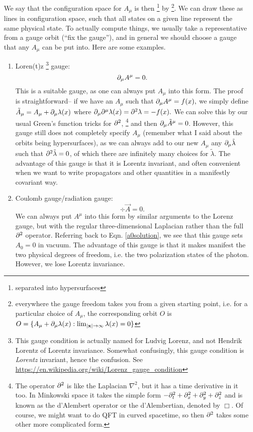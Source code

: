 We say that the configuration space for $A_\mu$ is then \footnote{separated into hypersurfaces} by \footnote{everywhere the gauge freedom takes you from a given starting point, i.e. for a particular choice of $A_\mu$, the corresponding orbit $O$ is $O=\{A_\mu+\partial_\mu \lambda(x): \lim_{|\boldsymbol{\mathbf{x}}|\to \infty }\lambda(x)=0\}$}. We can draw these as lines in configuration space, such that all states on a given line represent the same physical state. To actually compute things, we usually take a representative from a gauge orbit (``fix the gauge''), and in general we should choose a gauge that any $A_\mu$ can be put into. Here are some examples.
\begin{enumerate}
    \item Loren(t)z%
        \footnote{This gauge condition is actually named for Ludvig Lorenz, and not Hendrik Lorentz of Lorentz invariance. Somewhat confusingly, this gauge condition is \emph{Lorentz} invariant, hence the confusion. See \url{https://en.wikipedia.org/wiki/Lorenz_gauge_condition}}
        gauge:
    $$\partial_\mu A^\mu=0.$$
    This is a suitable gauge, as one can always put $A_\mu$ into this form. The proof is straightforward-- if we have an $A_\mu$ such that $\partial_\mu A^\mu=f(x),$ we simply define $\tilde A_\mu=A_\mu+\partial_\mu \lambda(x)$ where $\partial_\mu \partial^\mu \lambda(x)=\partial^2 \lambda =-f(x).$ We can solve this by our usual Green's function tricks for $\partial^2$,%
        \footnote{The operator $\partial^2$ is like the Laplacian $\nabla^2$, but it has a time derivative in it too. In Minkowski space it takes the simple form $-\partial_t^2+\partial_x^2+\partial_y^2+\partial_z^2$ and is known as the d'Alembert operator or the d'Alembertian, denoted by $\Box$. Of course, we might want to do QFT in curved spacetime, so then $\partial^2$ takes some other more complicated form.} 
    and then $\partial_\mu \tilde A^\mu=0$. However, this gauge still does not completely specify $A_\mu$ (remember what I said about the orbits being hypersurfaces), as we can always add to our new $A_\mu$ any $\partial_\mu \tilde \lambda$ such that $\partial^2 \tilde \lambda=0$, of which there are infinitely many choices for $\tilde \lambda$. The advantage of this gauge is that it is Lorentz invariant, and often convenient when we want to write propagators and other quantities in a manifestly covariant way.
    \item Coulomb gauge/radiation gauge:
    $$\div \vec A=0.$$
    We can always put $A^\mu$ into this form by similar arguments to the Lorenz gauge, but with the regular three-dimensional Laplacian rather than the full $\partial^2$ operator. Referring back to Eqn. \ref{a0solution}, we see that this gauge sets $A_0=0$ in vacuum. The advantage of this gauge is that it makes manifest the two physical degrees of freedom, i.e. the two polarization states of the photon. However, we lose Lorentz invariance.
\end{enumerate}

